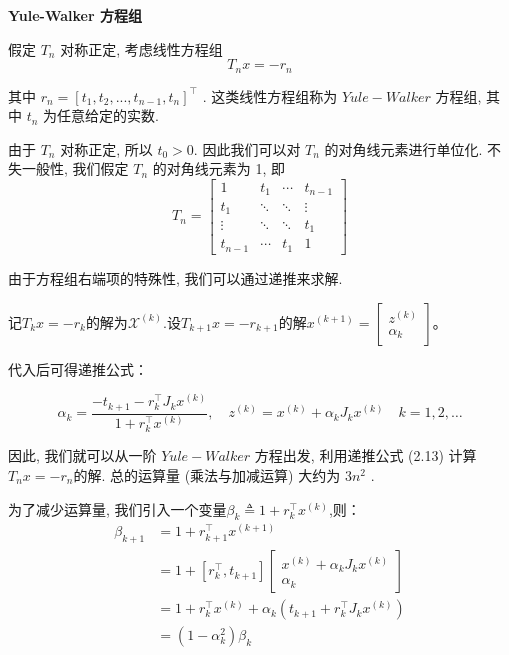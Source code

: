 \documentclass[12pt,a4paper]{article}
\begin{document}
{\bfseries Yule-Walker 方程组}

假定 $T_n$ 对称正定, 考虑线性方程组
\begin{equation}
T_{n} x=-r_{n}
\end{equation}

其中 $r_n = [t_1, t_2, . . . , t_{n−1}, t_n]^{\top}$
. 这类线性方程组称为 $Yule-Walker$ 方程组,
其中 $t_n$ 为任意给定的实数.

由于 $T_n$ 对称正定, 所以 $t_0 > 0$. 因此我们可以对 $T_n$ 的对角线元素进行单位化. 不失一般性, 我们假定 $T_n$ 的对角线元素为 1, 即
\begin{equation}
T_{n}=\left[\begin{array}{cccc}{1} & {t_{1}} & {\cdots} & {t_{n-1}} \\ {t_{1}} & {\ddots} & {\ddots} & {\vdots} \\ {\vdots} & {\ddots} & {\ddots} & {t_{1}} \\ {t_{n-1}} & {\cdots} & {t_{1}} & {1}\end{array}\right]
\end{equation}

由于方程组右端项的特殊性, 我们可以通过递推来求解.

记$T_{k} x=-r_{k}$的解为$\mathcal{X}^{(k)}$.设$T_{k+1} x=-r_{k+1}$的解$x^{(k+1)}=\left[\begin{array}{c}{z^{(k)}} \\ {\alpha_{k}}\end{array}\right]$。

代入后可得递推公式：

\begin{equation}
\alpha_{k}=\frac{-t_{k+1}-r_{k}^{\top} J_{k} x^{(k)}}{1+r_{k}^{\top} x^{(k)}}, \quad z^{(k)}=x^{(k)}+\alpha_{k} J_{k} x^{(k)} \quad k=1,2, \ldots
\end{equation}


因此, 我们就可以从一阶 $Yule-Walker$ 方程出发, 利用递推公式 (2.13) 计算
$T_nx = −r_n $的解. 总的运算量 (乘法与加减运算) 大约为 $3n^2$
.

为了减少运算量, 我们引入一个变量$\beta_{k} \triangleq 1+r_{k}^{\top} x^{(k)}$,则：
\begin{equation}
\begin{aligned} \beta_{k+1} &=1+r_{k+1}^{\top} x^{(k+1)} \\ &=1+\left[r_{k}^{\top}, t_{k+1}\right]\left[\begin{array}{c}{x^{(k)}+\alpha_{k} J_{k} x^{(k)}} \\ {\alpha_{k}}\end{array}\right] \\ &=1+r_{k}^{\top} x^{(k)}+\alpha_{k}\left(t_{k+1}+r_{k}^{\top} J_{k} x^{(k)}\right) \\ &=\left(1-\alpha_{k}^{2}\right) \beta_{k} \end{aligned}
\end{equation}
\end{document}
